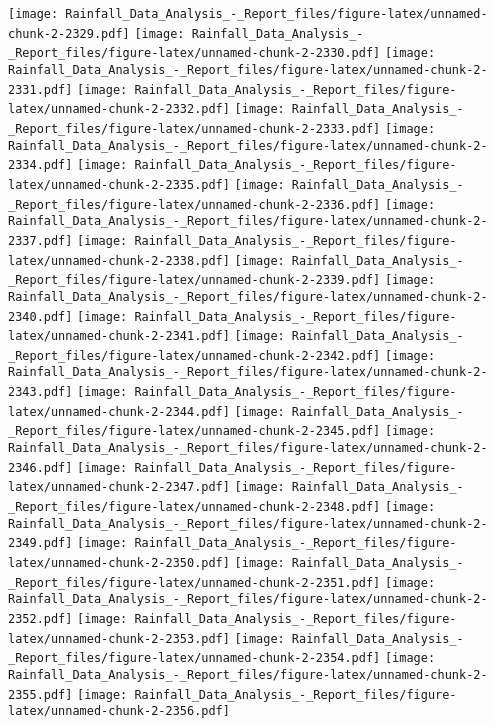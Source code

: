 \documentclass[
]{article}
\begin{document}
\texttt{[image: Rainfall\_Data\_Analysis\_-\_Report\_files/figure-latex/unnamed-chunk-2-2329.pdf]}
\texttt{[image: Rainfall\_Data\_Analysis\_-\_Report\_files/figure-latex/unnamed-chunk-2-2330.pdf]}
\texttt{[image: Rainfall\_Data\_Analysis\_-\_Report\_files/figure-latex/unnamed-chunk-2-2331.pdf]}
\texttt{[image: Rainfall\_Data\_Analysis\_-\_Report\_files/figure-latex/unnamed-chunk-2-2332.pdf]}
\texttt{[image: Rainfall\_Data\_Analysis\_-\_Report\_files/figure-latex/unnamed-chunk-2-2333.pdf]}
\texttt{[image: Rainfall\_Data\_Analysis\_-\_Report\_files/figure-latex/unnamed-chunk-2-2334.pdf]}
\texttt{[image: Rainfall\_Data\_Analysis\_-\_Report\_files/figure-latex/unnamed-chunk-2-2335.pdf]}
\texttt{[image: Rainfall\_Data\_Analysis\_-\_Report\_files/figure-latex/unnamed-chunk-2-2336.pdf]}
\texttt{[image: Rainfall\_Data\_Analysis\_-\_Report\_files/figure-latex/unnamed-chunk-2-2337.pdf]}
\texttt{[image: Rainfall\_Data\_Analysis\_-\_Report\_files/figure-latex/unnamed-chunk-2-2338.pdf]}
\texttt{[image: Rainfall\_Data\_Analysis\_-\_Report\_files/figure-latex/unnamed-chunk-2-2339.pdf]}
\texttt{[image: Rainfall\_Data\_Analysis\_-\_Report\_files/figure-latex/unnamed-chunk-2-2340.pdf]}
\texttt{[image: Rainfall\_Data\_Analysis\_-\_Report\_files/figure-latex/unnamed-chunk-2-2341.pdf]}
\texttt{[image: Rainfall\_Data\_Analysis\_-\_Report\_files/figure-latex/unnamed-chunk-2-2342.pdf]}
\texttt{[image: Rainfall\_Data\_Analysis\_-\_Report\_files/figure-latex/unnamed-chunk-2-2343.pdf]}
\texttt{[image: Rainfall\_Data\_Analysis\_-\_Report\_files/figure-latex/unnamed-chunk-2-2344.pdf]}
\texttt{[image: Rainfall\_Data\_Analysis\_-\_Report\_files/figure-latex/unnamed-chunk-2-2345.pdf]}
\texttt{[image: Rainfall\_Data\_Analysis\_-\_Report\_files/figure-latex/unnamed-chunk-2-2346.pdf]}
\texttt{[image: Rainfall\_Data\_Analysis\_-\_Report\_files/figure-latex/unnamed-chunk-2-2347.pdf]}
\texttt{[image: Rainfall\_Data\_Analysis\_-\_Report\_files/figure-latex/unnamed-chunk-2-2348.pdf]}
\texttt{[image: Rainfall\_Data\_Analysis\_-\_Report\_files/figure-latex/unnamed-chunk-2-2349.pdf]}
\texttt{[image: Rainfall\_Data\_Analysis\_-\_Report\_files/figure-latex/unnamed-chunk-2-2350.pdf]}
\texttt{[image: Rainfall\_Data\_Analysis\_-\_Report\_files/figure-latex/unnamed-chunk-2-2351.pdf]}
\texttt{[image: Rainfall\_Data\_Analysis\_-\_Report\_files/figure-latex/unnamed-chunk-2-2352.pdf]}
\texttt{[image: Rainfall\_Data\_Analysis\_-\_Report\_files/figure-latex/unnamed-chunk-2-2353.pdf]}
\texttt{[image: Rainfall\_Data\_Analysis\_-\_Report\_files/figure-latex/unnamed-chunk-2-2354.pdf]}
\texttt{[image: Rainfall\_Data\_Analysis\_-\_Report\_files/figure-latex/unnamed-chunk-2-2355.pdf]}
\texttt{[image: Rainfall\_Data\_Analysis\_-\_Report\_files/figure-latex/unnamed-chunk-2-2356.pdf]}
\end{document}
